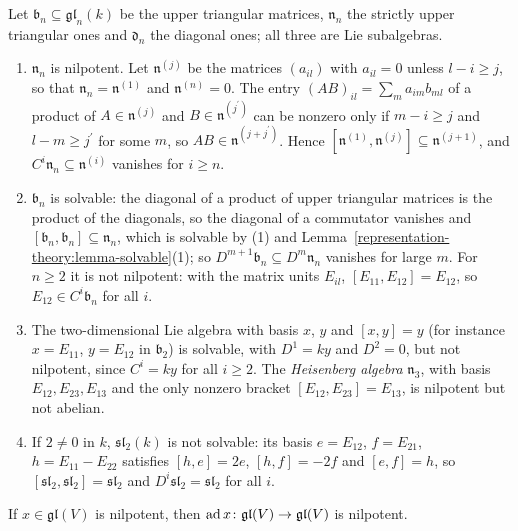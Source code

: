 \begin{example}\label{representation-theory:example-triangular}
Let $\mathfrak{b}_n \subseteq \mathfrak{gl}_n(k)$ be the upper triangular matrices, $\mathfrak{n}_n$ the strictly upper triangular ones and $\mathfrak{d}_n$ the diagonal
ones; all three are Lie subalgebras.
\begin{enumerate}
\item $\mathfrak{n}_n$ is nilpotent. Let $\mathfrak{n}^{(j)}$ be the matrices $(a_{il})$ with $a_{il} = 0$ unless $l - i \geq j$, so that
$\mathfrak{n}_n = \mathfrak{n}^{(1)}$ and $\mathfrak{n}^{(n)} = 0$. The entry $(AB)_{il} = \sum_ma_{im}b_{ml}$ of a product of $A \in \mathfrak{n}^{(j)}$ and
$B \in \mathfrak{n}^{(j^{\prime})}$ can be nonzero only if $m - i \geq j$ and $l - m \geq j^{\prime}$ for some $m$, so $AB \in \mathfrak{n}^{(j + j^{\prime})}$. Hence
$[\mathfrak{n}^{(1)}, \mathfrak{n}^{(j)}] \subseteq \mathfrak{n}^{(j+1)}$, and $C^i\mathfrak{n}_n \subseteq \mathfrak{n}^{(i)}$ vanishes for $i \geq n$.
\item $\mathfrak{b}_n$ is solvable: the diagonal of a product of upper triangular matrices is the product of the diagonals, so the diagonal of a commutator vanishes and
$[\mathfrak{b}_n, \mathfrak{b}_n] \subseteq \mathfrak{n}_n$, which is solvable by (1) and Lemma~\ref{representation-theory:lemma-solvable}(1); so
$D^{m+1}\mathfrak{b}_n \subseteq D^m\mathfrak{n}_n$ vanishes for large $m$. For $n \geq 2$ it is not nilpotent: with the matrix units $E_{il}$,
$[E_{11}, E_{12}] = E_{12}$, so $E_{12} \in C^i\mathfrak{b}_n$ for all $i$.
\item The two-dimensional Lie algebra with basis $x$, $y$ and $[x, y] = y$ (for instance $x = E_{11}$, $y = E_{12}$ in $\mathfrak{b}_2$) is solvable, with
$D^1 = ky$ and $D^2 = 0$, but not nilpotent, since $C^i = ky$ for all $i \geq 2$. The \emph{Heisenberg algebra} $\mathfrak{n}_3$, with basis $E_{12}, E_{23}, E_{13}$
and the only nonzero bracket $[E_{12}, E_{23}] = E_{13}$, is nilpotent but not abelian.
\item If $2 \neq 0$ in $k$, $\mathfrak{sl}_2(k)$ is not solvable: its basis $e = E_{12}$, $f = E_{21}$, $h = E_{11} - E_{22}$ satisfies
$[h, e] = 2e$, $[h, f] = -2f$ and $[e, f] = h$, so $[\mathfrak{sl}_2, \mathfrak{sl}_2] = \mathfrak{sl}_2$ and $D^i\mathfrak{sl}_2 = \mathfrak{sl}_2$ for all $i$.
\end{enumerate}
\end{example}

\begin{lemma}\label{representation-theory:lemma-ad-nilpotent}
If $x \in \mathfrak{gl}(V)$ is nilpotent, then $\operatorname{ad} x \colon \mathfrak{gl}(V) \to \mathfrak{gl}(V)$ is nilpotent.
\end{lemma}

